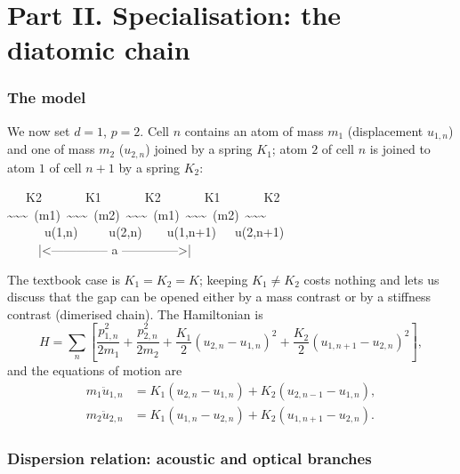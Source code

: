 \documentclass[11pt,a4paper]{article}
\begin{document}
\part*{Part II. Specialisation: the diatomic chain}

\section{The model}

We now set $d=1$, $p=2$. Cell $n$ contains an atom of mass $m_1$
(displacement $u_{1,n}$) and one of mass $m_2$ ($u_{2,n}$) joined by a spring
$K_1$; atom $2$ of cell $n$ is joined to atom $1$ of cell $n+1$ by a spring
$K_2$:

\begin{center}
\small\ttfamily
\ \ \ K2\ \ \ \ \ \ \ K1\ \ \ \ \ \ \ K2\ \ \ \ \ \ \ K1\ \ \ \ \ \ \ K2\\
\textasciitilde\textasciitilde\textasciitilde\ (m1)\ \textasciitilde\textasciitilde\textasciitilde\ (m2)\ \textasciitilde\textasciitilde\textasciitilde\ (m1)\ \textasciitilde\textasciitilde\textasciitilde\ (m2)\ \textasciitilde\textasciitilde\textasciitilde\\
\ \ \ \ \ \ u(1,n)\ \ \ \ \ u(2,n)\ \ \ \ u(1,n+1)\ \ \ u(2,n+1)\\
\ \ \ \ \ |<-------------- a -------------->|
\end{center}

\noindent The textbook case is $K_1=K_2=K$; keeping $K_1\neq K_2$ costs
nothing and lets us discuss that the gap can be opened either by a mass
contrast or by a stiffness contrast (dimerised chain). The Hamiltonian is
\begin{equation}
H=\sum_n\left[\frac{p_{1,n}^2}{2m_1}+\frac{p_{2,n}^2}{2m_2}
+\frac{K_1}{2}(u_{2,n}-u_{1,n})^2+\frac{K_2}{2}(u_{1,n+1}-u_{2,n})^2\right],
\end{equation}
and the equations of motion are
\begin{align}
m_1\ddot u_{1,n}&=K_1(u_{2,n}-u_{1,n})+K_2(u_{2,n-1}-u_{1,n}),\\
m_2\ddot u_{2,n}&=K_1(u_{1,n}-u_{2,n})+K_2(u_{1,n+1}-u_{2,n}).
\end{align}

\section{Dispersion relation: acoustic and optical branches}
\end{document}
